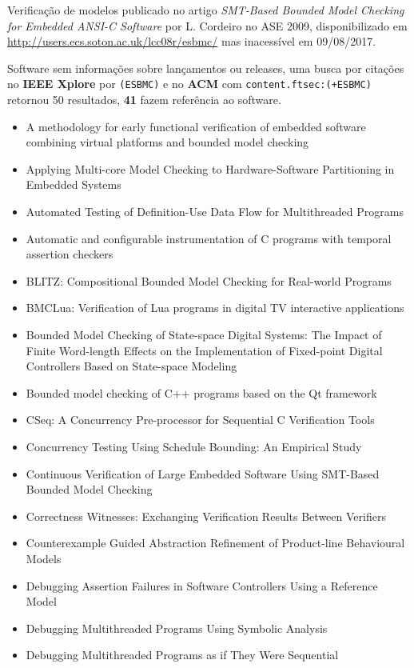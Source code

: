 Verificação de modelos
publicado no artigo {\it SMT-Based Bounded Model Checking for Embedded ANSI-C Software}
por L. Cordeiro
no ASE 2009,
disponibilizado em \url{http://users.ecs.soton.ac.uk/lcc08r/esbmc/}
mas inacessível em 09/08/2017.

Software sem informações sobre lançamentos ou releases,
uma busca por citações no {\bf IEEE Xplore} por
\texttt{(ESBMC)}
e no {\bf ACM} com
\texttt{content.ftsec:(+ESBMC)}
retornou
50 resultados,
{\bf 41} fazem referência ao software.

\begin{itemize}
\item A methodology for early functional verification of embedded software combining virtual platforms and bounded model checking
\item Applying Multi-core Model Checking to Hardware-Software Partitioning in Embedded Systems
\item Automated Testing of Definition-Use Data Flow for Multithreaded Programs
\item Automatic and configurable instrumentation of C programs with temporal assertion checkers
\item BLITZ: Compositional Bounded Model Checking for Real-world Programs
\item BMCLua: Verification of Lua programs in digital TV interactive applications
\item Bounded Model Checking of State-space Digital Systems: The Impact of Finite Word-length Effects on the Implementation of Fixed-point Digital Controllers Based on State-space Modeling
\item Bounded model checking of C++ programs based on the Qt framework
\item CSeq: A Concurrency Pre-processor for Sequential C Verification Tools
\item Concurrency Testing Using Schedule Bounding: An Empirical Study
\item Continuous Verification of Large Embedded Software Using SMT-Based Bounded Model Checking
\item Correctness Witnesses: Exchanging Verification Results Between Verifiers
\item Counterexample Guided Abstraction Refinement of Product-line Behavioural Models
\item Debugging Assertion Failures in Software Controllers Using a Reference Model
\item Debugging Multithreaded Programs Using Symbolic Analysis
\item Debugging Multithreaded Programs as if They Were Sequential

\end{itemize}
